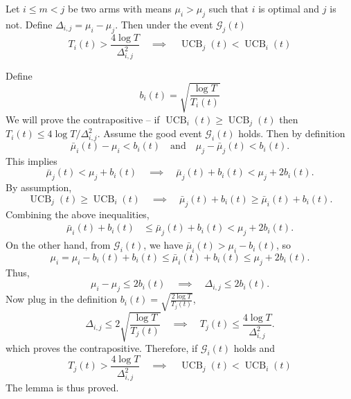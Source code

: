 \documentclass[opre,blindrev]{informs3}
\newcommand{\UCB}{\operatorname{UCB}}
\newcommand{\bE}[1]{{\mathbb{E}\left[#1\right]}}
\newcommand{\bP}[1]{{\mathbb{P}\left(#1\right)}}
\begin{document}
\begin{APPENDICES}
\begin{lemma}\label{lem:arm-comp}
    Let \(i\leq m <j\) be two arms with means \(\mu_i>\mu_j\) such that \(i\) is optimal and \(j\) is not. Define \(\Delta_{i,j}=\mu_i-\mu_j\). Then under the event \(\mathcal{G}_j(t)\)
    \begin{equation}\label{eq:lem-comp-T}
        T_i(t) > \frac{4\log T}{\Delta_{i,j}^2} \quad \implies \quad \UCB_j(t) < \UCB_i(t)
    \end{equation}
\end{lemma}
    Define 
    \[b_i(t)=\sqrt{\frac{\log T}{T_i(t)}}\]
    We will prove the contrapositive -- if \(\UCB_i(t)\geq \UCB_j(t)\) then \(T_i(t) \leq  {4\log T}/{\Delta_{i,j}^2}\).  Assume the good event \( \mathcal{G}_i(t) \) holds. Then by definition
    \[
        \bar{\mu}_i(t) - \mu_i < b_i(t) \quad \text{and} \quad \mu_j-\bar{\mu}_j(t) < b_i(t).
    \]
    This implies
    \[
        \bar{\mu}_j(t) < \mu_j + b_i(t) \quad \implies \quad \bar{\mu}_j(t) + b_i(t) < \mu_j + 2b_i(t).
    \]
    By assumption,
    \[
        \UCB_j(t) \geq  \UCB_i(t) \quad \implies \quad \bar{\mu}_j(t) + b_i(t) \geq \bar{\mu}_i(t) + b_i(t).
    \]
    Combining the above inequalities,
    \begin{align*}
        \bar{\mu}_i(t) + b_i(t) &\leq \bar{\mu}_j(t) + b_i(t) 
        < \mu_j + 2b_i(t).
    \end{align*}
    On the other hand, from \( \mathcal{G}_i(t) \), we have \( \bar{\mu}_i(t) > \mu_i - b_i(t) \), so
    \[
        \mu_i =\mu_i - b_i(t) + b_i(t)\leq \bar{\mu}_i(t) + b_i(t) \leq \mu_j + 2b_i(t).
    \]
    Thus,
    \[
        \mu_i - \mu_j \leq 2b_i(t) \quad \implies \quad \Delta_{i,j} \leq 2b_i(t).
    \]
    Now plug in the definition \( b_i(t) = \sqrt{\frac{2\log T}{T_j(t)}} \),
    \[
        \Delta_{i,j} \leq 2 \sqrt{\frac{\log T}{T_j(t)}} \quad \implies \quad T_j(t) \leq \frac{4\log T}{\Delta_{i,j}^2}.
    \]
    which proves the contrapositive. Therefore, if \( \mathcal{G}_i(t) \) holds and 
    \[
        T_j(t) > \frac{4\log T}{\Delta_{i,j}^2} \quad \implies \quad \UCB_j(t)<\UCB_i(t)
    \]
The lemma is thus proved. \Halmos  



\end{APPENDICES}
\end{document}
